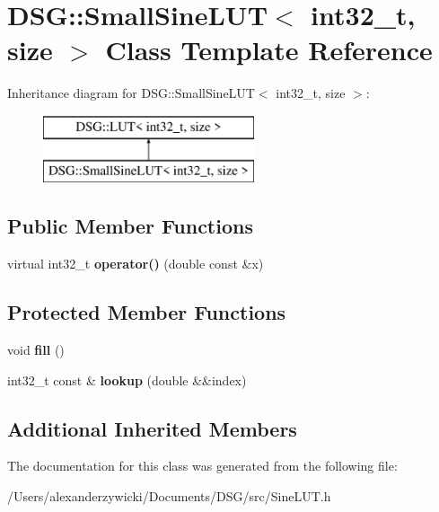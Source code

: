 \hypertarget{class_d_s_g_1_1_small_sine_l_u_t_3_01int32__t_00_01size_01_4}{\section{D\+S\+G\+:\+:Small\+Sine\+L\+U\+T$<$ int32\+\_\+t, size $>$ Class Template Reference}
\label{class_d_s_g_1_1_small_sine_l_u_t_3_01int32__t_00_01size_01_4}
}
Inheritance diagram for D\+S\+G\+:\+:Small\+Sine\+L\+U\+T$<$ int32\+\_\+t, size $>$\+:\begin{figure}[H]
\begin{center}
\leavevmode
\includegraphics[height=2.000000cm]{class_d_s_g_1_1_small_sine_l_u_t_3_01int32__t_00_01size_01_4}
\end{center}
\end{figure}
\subsection*{Public Member Functions}
\begin{DoxyCompactItemize}
\item 
\hypertarget{class_d_s_g_1_1_small_sine_l_u_t_3_01int32__t_00_01size_01_4_a63873dafa3ddb5c6c36fa2c2c1ab5bf7}{virtual int32\+\_\+t {\bfseries operator()} (double const \&x)}\label{class_d_s_g_1_1_small_sine_l_u_t_3_01int32__t_00_01size_01_4_a63873dafa3ddb5c6c36fa2c2c1ab5bf7}

\end{DoxyCompactItemize}
\subsection*{Protected Member Functions}
\begin{DoxyCompactItemize}
\item 
\hypertarget{class_d_s_g_1_1_small_sine_l_u_t_3_01int32__t_00_01size_01_4_a5f08d4c634a95d05edb6dec411df4270}{void {\bfseries fill} ()}\label{class_d_s_g_1_1_small_sine_l_u_t_3_01int32__t_00_01size_01_4_a5f08d4c634a95d05edb6dec411df4270}

\item 
\hypertarget{class_d_s_g_1_1_small_sine_l_u_t_3_01int32__t_00_01size_01_4_ab2ba369359e94c52febf2dbff7abdc67}{int32\+\_\+t const \& {\bfseries lookup} (double \&\&index)}\label{class_d_s_g_1_1_small_sine_l_u_t_3_01int32__t_00_01size_01_4_ab2ba369359e94c52febf2dbff7abdc67}

\end{DoxyCompactItemize}
\subsection*{Additional Inherited Members}


The documentation for this class was generated from the following file\+:\begin{DoxyCompactItemize}
\item 
/\+Users/alexanderzywicki/\+Documents/\+D\+S\+G/src/Sine\+L\+U\+T.\+h\end{DoxyCompactItemize}

